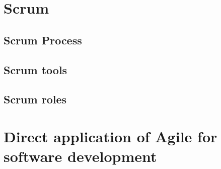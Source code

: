\documentclass[../main.tex]{subfiles}
\begin{document}
\section{Scrum}
\subsection{Scrum Process}
\subsection{Scrum tools}
\subsection{Scrum roles}
\section{Direct application of Agile for software development}
\cleardoublepage
\end{document}
